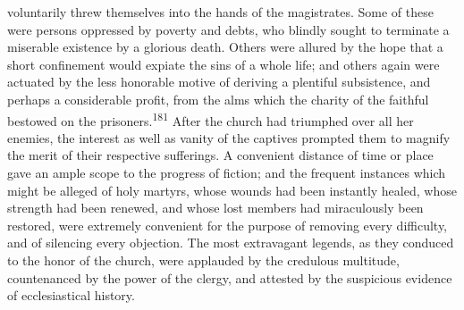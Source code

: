 voluntarily threw themselves into the hands of the magistrates.
Some of these were persons oppressed by poverty and debts, who
blindly sought to terminate a miserable existence by a glorious
death. Others were allured by the hope that a short confinement
would expiate the sins of a whole life; and others again were
actuated by the less honorable motive of deriving a plentiful
subsistence, and perhaps a considerable profit, from the alms
which the charity of the faithful bestowed on the prisoners.\textsuperscript{181}
After the church had triumphed over all her enemies, the interest
as well as vanity of the captives prompted them to magnify the
merit of their respective sufferings. A convenient distance of
time or place gave an ample scope to the progress of fiction; and
the frequent instances which might be alleged of holy martyrs,
whose wounds had been instantly healed, whose strength had been
renewed, and whose lost members had miraculously been restored,
were extremely convenient for the purpose of removing every
difficulty, and of silencing every objection. The most
extravagant legends, as they conduced to the honor of the church,
were applauded by the credulous multitude, countenanced by the
power of the clergy, and attested by the suspicious evidence of
ecclesiastical history.


